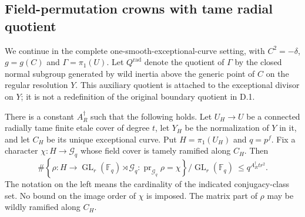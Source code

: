 \subsection{Field-permutation crowns with tame radial quotient}

We continue in the complete one-smooth-exceptional-curve
setting, with $C^2=-\delta$, $g=g(C)$ and $\Gamma=\pi_1(U)$.
Let $Q^{\mathrm{rad}}$ denote the quotient of $\Gamma$ by
the closed normal subgroup generated by wild inertia above
the generic point of $C$ on the regular resolution $Y$.
This auxiliary quotient is attached to the exceptional
divisor on $Y$; it is not a redefinition of the original
boundary quotient in D.1.

\begin{theorem}
\label{D:tame-resolution-semilinear-count}
There is a constant $A_R^\dagger$ such that the following
holds. Let $U_H\to U$ be a connected radially tame finite
etale cover of degree $t$, let $Y_H$ be the normalization
of $Y$ in it, and let $C_H$ be its unique exceptional
curve. Put $H=\pi_1(U_H)$ and $q=p^f$. Fix a character
$\chi:H\to\mathcal G_q$ whose field cover is tamely
ramified along $C_H$. Then
\[
 \#\left\{\rho:H\to\operatorname{GL}_r(\mathbb F_q)
                         \rtimes\mathcal G_q:
          \operatorname{pr}_{\mathcal G_q}\rho=\chi\right\}
           /\operatorname{GL}_r(\mathbb F_q)
                      \ \leq q^{A_R^\dagger t r^2}.     \tag{D.TS.1}
\]
The notation on the left means the cardinality of the
indicated conjugacy-class set. No bound on the image
order of $\chi$ is imposed. The matrix part of $\rho$
may be wildly ramified along $C_H$.
\end{theorem}

